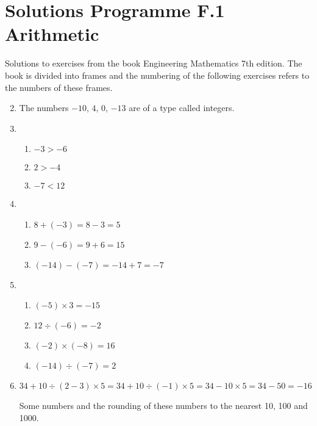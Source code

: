 \documentclass[fleqn]{article}
\begin{document}
\section*{Solutions Programme F.1 Arithmetic}
Solutions to exercises from the book Engineering Mathematics 7th edition. The book is divided into frames and the numbering of the following exercises refers to the numbers of these frames.

\begin{enumerate}[label=\textbf{\arabic*.},labelsep=2em]

\setcounter{enumi}{1}
\item
The numbers $-10$, $4$, $0$, $-13$ are of a type called integers.

\item

\begin{enumerate}[label=\textbf{(\alph*)},labelsep=2em]
\item $-3 > -6$
\item $2 > -4$
\item $-7 < 12$
\end{enumerate} 

\setcounter{enumi}{4}
\item

\begin{enumerate}[label=\textbf{(\alph*)}]
\item $8 + (-3) = 8 - 3 = 5$
\item $9 - (-6) = 9 + 6 = 15$
\item $(-14) - (-7) = -14 + 7 = -7$
\end{enumerate}

\setcounter{enumi}{6}
\item
\begin{enumerate}[label=\textbf{(\alph*)}]
\item $(-5) \times 3 = -15$
\item $12 \div (-6) = -2$
\item $(-2) \times (-8) = 16$
\item $(-14) \div (-7) = 2$
\end{enumerate}

\setcounter{enumi}{8} 
\item
$34 + 10 \div (2 - 3) \times 5 = 
34 + 10 \div (-1) \times 5 = 
34 -10 \times 5 = 
34 - 50 = -16$

\setcounter{enumi}{12}

Some numbers and the rounding of these numbers to the nearest 10, 100 and 1000. 


\end{enumerate}
\end{document}
